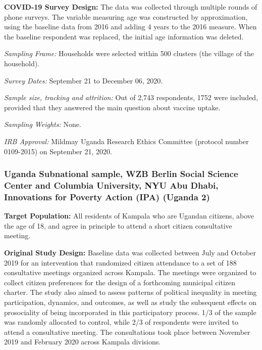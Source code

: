 \documentclass[
  12pt,
]{article}
\begin{document}
\textbf{COVID-19 Survey Design:} The data was collected through multiple rounds of phone surveys. The variable measuring age was constructed by approximation, using the baseline data from 2016 and adding 4 years to the 2016 measure. When the baseline respondent was replaced, the initial age information was deleted.

\emph{Sampling Frame:} Households were selected within 500 clusters (the village of the household).

\emph{Survey Dates:} September 21 to December 06, 2020.

\emph{Sample size, tracking and attrition:} Out of 2,743 respondents, 1752 were included, provided that they answered the main question about vaccine uptake.

\emph{Sampling Weights:} None.

\emph{IRB Approval:} Mildmay Uganda Research Ethics Committee (protocol number 0109-2015) on September 21, 2020.

\hypertarget{uganda-subnational-sample-wzb-berlin-social-science-center-and-columbia-university-nyu-abu-dhabi-innovations-for-poverty-action-ipa-uganda-2}{%
\subsubsection*{Uganda Subnational sample, WZB Berlin Social Science Center and Columbia University, NYU Abu Dhabi, Innovations for Poverty Action (IPA) (Uganda 2)}\label{uganda-subnational-sample-wzb-berlin-social-science-center-and-columbia-university-nyu-abu-dhabi-innovations-for-poverty-action-ipa-uganda-2}}

\textbf{Target Population:} All residents of Kampala who are Ugandan citizens, above the age of 18, and agree in principle to attend a short citizen consultative meeting.

\textbf{Original Study Design:} Baseline data was collected between July and October 2019 for an intervention that randomized citizen attendance to a set of 188 consultative meetings organized across Kampala. The meetings were organized to collect citizen preferences for the design of a forthcoming municipal citizen charter. The study also aimed to assess patterns of political inequality in meeting participation, dynamics, and outcomes, as well as study the subsequent effects on prosociality of being incorporated in this participatory process. 1/3 of the sample was randomly allocated to control, while 2/3 of respondents were invited to attend a consultative meeting. The consultations took place between November 2019 and February 2020 across Kampala divisions.
\end{document}
